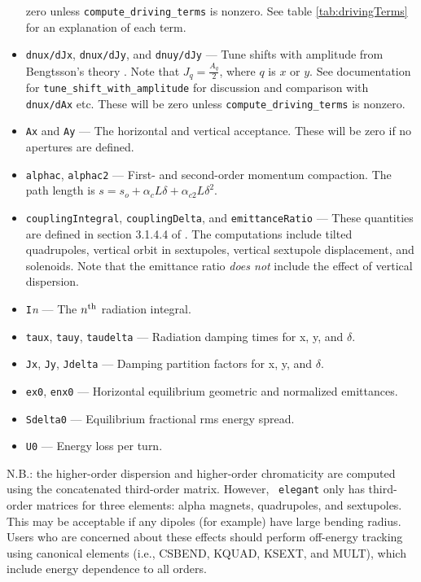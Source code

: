\documentclass[11pt]{article}
\begin{document}
\begin{itemize}
 zero unless \verb|compute_driving_terms| is nonzero.  See table \ref{tab:drivingTerms} for an explanation of each term.
\item {\tt dnux/dJx}, {\tt dnux/dJy},  and {\tt dnuy/dJy} --- Tune shifts with amplitude from Bengtsson's theory \cite{Bengtsson}.
  Note that $J_q = \frac{A_q}{2}$, where $q$ is $x$ or $y$.
 See documentation for \verb|tune_shift_with_amplitude| for discussion and comparison with {\tt dnux/dAx} etc.
 These will be zero unless \verb|compute_driving_terms| is nonzero.
\item {\tt Ax} and {\tt Ay} --- The horizontal and vertical acceptance.  These will be zero if no apertures are
  defined.
\item {\tt alphac}, {\tt alphac2} --- First- and second-order momentum compaction.  The path length is 
  $s = s_o + \alpha_c L \delta + \alpha_{c2} L \delta^2$.
\item {\tt couplingIntegral}, {\tt couplingDelta}, and {\tt emittanceRatio} --- These quantities are defined
  in section 3.1.4.4 of \cite{HAPE}.  The computations include tilted quadrupoles, vertical orbit in sextupoles,
  vertical sextupole displacement, and solenoids.  Note that the emittance ratio {\em does not} include 
  the effect of vertical dispersion.
\item {\tt I}{\em n} --- The $n^{\rm th}$ radiation integral.
\item {\tt taux}, {\tt tauy}, {\tt taudelta} --- Radiation damping times for x, y, and $\delta$.
\item {\tt Jx}, {\tt Jy}, {\tt Jdelta} --- Damping partition factors for  x, y, and $\delta$.
\item {\tt ex0}, {\tt enx0} --- Horizontal equilibrium geometric and normalized emittances.
\item {\tt Sdelta0} --- Equilibrium fractional rms energy spread.
\item {\tt U0} --- Energy loss per turn.
\end{itemize}

N.B.: the higher-order dispersion and higher-order chromaticity are
computed using the concatenated third-order matrix.  However, {\tt
elegant} only has third-order matrices for three elements:
alpha magnets, quadrupoles, and sextupoles.  This may be acceptable if
any dipoles (for example) have large bending radius.  Users who are
concerned about these effects should perform off-energy tracking using
canonical elements (i.e., CSBEND, KQUAD, KSEXT, and MULT), which
include energy dependence to all orders.
\end{document}
